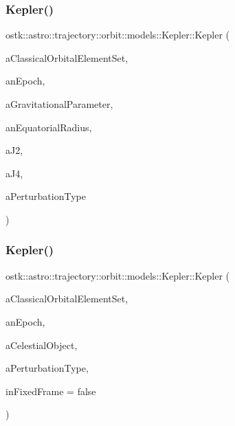 \subsubsection{\texorpdfstring{Kepler()}{Kepler()}\hspace{0.1cm}{\footnotesize\ttfamily [1/2]}}
{\footnotesize\ttfamily ostk\+::astro\+::trajectory\+::orbit\+::models\+::\+Kepler\+::\+Kepler (\begin{DoxyParamCaption}\item[{const \hyperlink{classostk_1_1astro_1_1trajectory_1_1orbit_1_1models_1_1kepler_1_1_c_o_e}{C\+OE} \&}]{a\+Classical\+Orbital\+Element\+Set,  }\item[{const Instant \&}]{an\+Epoch,  }\item[{const Derived \&}]{a\+Gravitational\+Parameter,  }\item[{const Length \&}]{an\+Equatorial\+Radius,  }\item[{const Real \&}]{a\+J2,  }\item[{const Real \&}]{a\+J4,  }\item[{const \hyperlink{classostk_1_1astro_1_1trajectory_1_1orbit_1_1models_1_1_kepler_a3750f9177ff06a1938826e2c2881d5a9}{Kepler\+::\+Perturbation\+Type} \&}]{a\+Perturbation\+Type }\end{DoxyParamCaption})}

\mbox{\label{classostk_1_1astro_1_1trajectory_1_1orbit_1_1models_1_1_kepler_afc95c7ec38bba8e24eba704c408523b6}} 
\subsubsection{\texorpdfstring{Kepler()}{Kepler()}\hspace{0.1cm}{\footnotesize\ttfamily [2/2]}}
{\footnotesize\ttfamily ostk\+::astro\+::trajectory\+::orbit\+::models\+::\+Kepler\+::\+Kepler (\begin{DoxyParamCaption}\item[{const \hyperlink{classostk_1_1astro_1_1trajectory_1_1orbit_1_1models_1_1kepler_1_1_c_o_e}{C\+OE} \&}]{a\+Classical\+Orbital\+Element\+Set,  }\item[{const Instant \&}]{an\+Epoch,  }\item[{const Celestial \&}]{a\+Celestial\+Object,  }\item[{const \hyperlink{classostk_1_1astro_1_1trajectory_1_1orbit_1_1models_1_1_kepler_a3750f9177ff06a1938826e2c2881d5a9}{Kepler\+::\+Perturbation\+Type} \&}]{a\+Perturbation\+Type,  }\item[{const bool}]{in\+Fixed\+Frame = {\ttfamily false} }\end{DoxyParamCaption})}



